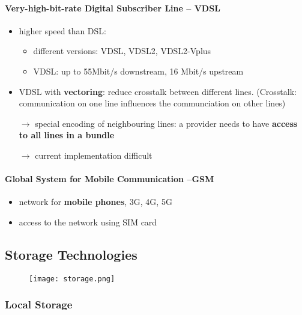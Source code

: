 \paragraph{Very-high-bit-rate Digital Subscriber Line -- VDSL}
\begin{itemize}
	\item higher speed than DSL:
	\begin{itemize}
		\item different versions: VDSL, VDSL2, VDSL2-Vplus
		\item VDSL: up to 55Mbit/s downstream, 16 Mbit/s upstream 
	\end{itemize}
	\item VDSL with \textbf{vectoring}: reduce crosstalk between different lines. (Crosstalk: communication on one line influences the communciation on other lines)
	
	$\rightarrow$ special encoding of neighbouring lines: a provider needs to have \textbf{access to all lines in a bundle}
	
	$\rightarrow$ current implementation difficult
\end{itemize}

\paragraph{Global System for Mobile Communication --GSM}
\begin{itemize}
	\item network for \textbf{mobile phones}, 3G, 4G, 5G
	\item access to the network using SIM card
\end{itemize}

\subsection{Storage Technologies}
\begin{figure}[H]
	\centering
	\texttt{[image: storage.png]}
\end{figure}
\subsubsection{Local Storage}

